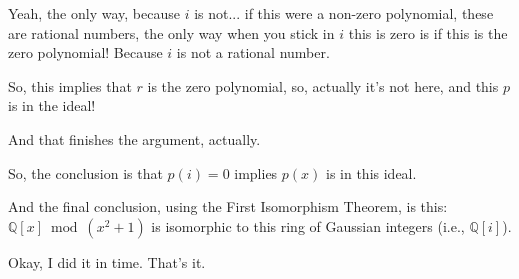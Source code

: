 \begin{speech}[01:29:20 - 01:30:14]
Yeah, the only way, because $i$ is not... if this were a non-zero polynomial, these are rational numbers, the only way when you stick in $i$ this is zero is if this is the zero polynomial! Because $i$ is not a rational number. 

So, this implies that $r$ is the zero polynomial,  so, actually it's not here, and this $p$ is in the ideal!  

And that finishes the argument, actually. 

So, the conclusion is that $p(i) = 0$ implies $p(x)$ is in this ideal.  

And the final conclusion, using the First Isomorphism Theorem, is this: $\mathbb{Q}[x] \bmod (x^2 + 1)$ is isomorphic to this ring of Gaussian integers (i.e., $\mathbb{Q}[i]$).  

Okay, I did it in time. That's it. 
\end{speech}

